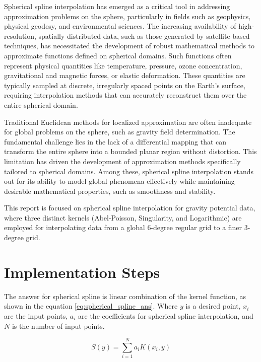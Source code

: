 \documentclass[12pt]{article}
\begin{document}
	Spherical spline interpolation has emerged as a critical tool in addressing approximation problems on the sphere, particularly in fields such as geophysics, physical geodesy, and environmental sciences. The increasing availability of high-resolution, spatially distributed data, such as those generated by satellite-based techniques, has necessitated the development of robust mathematical methods to approximate functions defined on spherical domains. Such functions often represent physical quantities like temperature, pressure, ozone concentration, gravitational and magnetic forces, or elastic deformation. These quantities are typically sampled at discrete, irregularly spaced points on the Earth's surface, requiring interpolation methods that can accurately reconstruct them over the entire spherical domain.
	
	Traditional Euclidean methods for localized approximation are often inadequate for global problems on the sphere, such as gravity field determination. The fundamental challenge lies in the lack of a differential mapping that can transform the entire sphere into a bounded planar region without distortion. This limitation has driven the development of approximation methods specifically tailored to spherical domains. Among these, spherical spline interpolation stands out for its ability to model global phenomena effectively while maintaining desirable mathematical properties, such as smoothness and stability.
	
	This report is focused on spherical spline interpolation for gravity potential data, where three distinct kernels (Abel-Poisson, Singularity, and Logarithmic) are employed for interpolating data from a global 6-degree regular grid to a finer 3-degree grid.
		
	\section{Implementation Steps}
	
	The answer for spherical spline is linear combination of the kernel function, as shown in the equation \ref{eq:spherical_spline_ans}. Where $y$ is a desired point, $x_i$ are the input points, $a_i$ are the coefficients for spherical spline interpolation, and $N$ is the number of input points.
	
	\begin{equation}
		S(y) = \sum_{i=1}^{N}a_iK(x_i,y)
		\label{eq:spherical_spline_ans}
	\end{equation}
	
\end{document}
